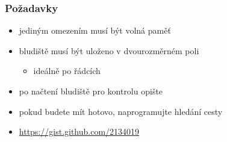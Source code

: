 \begin{frame}
	\frametitle{Požadavky}
	\begin{itemize}
		\item{jediným omezením musí být volná paměť}
		\item{bludiště musí být uloženo v dvourozměrném poli}
		\begin{itemize}
			\item{ideálně po řádcích}
		\end{itemize}
		\item{po načtení bludiště pro kontrolu opište}
		\item{pokud budete mít hotovo, naprogramujte hledání cesty}
		\item{\url{https://gist.github.com/2134019}}
	\end{itemize}
\end{frame}




